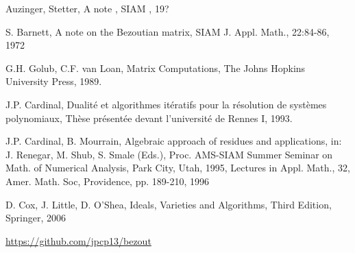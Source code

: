 \documentclass{standalone}
\begin{document}
  \begin{thebibliography}{00}

  {Auzinger, Stetter}, {A note }, {SIAM }, {19?}

  {S. Barnett}, {A note on the Bezoutian matrix}, {SIAM J. Appl. Math., 22:84-86}, {1972}

  {G.H. Golub, C.F. van Loan}, {Matrix Computations}, {The Johns Hopkins University Press}, {1989}.

  {J.P. Cardinal}, {Dualité et algorithmes itératifs pour la résolution de systèmes polynomiaux}, {Thèse présentée devant l'université de Rennes I}, {1993}.

  {J.P. Cardinal, B. Mourrain}, {Algebraic approach of residues and applications}, {in: J. Renegar, M. Shub, S. Smale (Eds.), Proc. AMS-SIAM Summer Seminar on Math. of Numerical Analysis, Park City, Utah, 1995, Lectures in Appl. Math., 32, Amer. Math. Soc, Providence, pp. 189-210}, {1996}

  D. Cox, J. Little, D. O'Shea,
  Ideals, Varieties and Algorithms,
  Third Edition,
  Springer,
  2006

  \url{https://github.com/jpcp13/bezout}

  \end{thebibliography}
\end{document}
